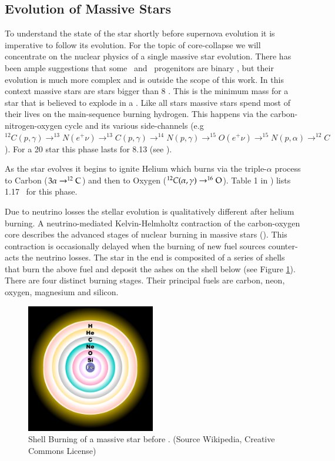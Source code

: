 \subsection{Evolution of Massive Stars}  To understand the state of the star shortly before supernova evolution it is imperative to follow its evolution. For the topic of core-collapse we will concentrate on the nuclear physics of a single massive star evolution. There has been ample suggestions that some \snii\ and \snibc\ progenitors are binary \citep{1992ApJ...391..246P}, but their evolution is much more complex and is outside the scope of this work.  In this context massive stars are stars bigger than 8 \msun. This is the minimum mass for a star that is believed to explode in a \snii. Like all stars massive stars spend most of their lives on the main-sequence burning hydrogen. This happens via the carbon-nitrogen-oxygen cycle and its various side-channels (e.g $^{12}C(p,\gamma)\rightarrow^{13}N(e^+\nu)\rightarrow^{13}C(p,\gamma)\rightarrow^{14}N(p,\gamma)\rightarrow^{15}O(e^+\nu)\rightarrow^{15}N(p,\alpha)\rightarrow^{12}C$). For a 20 \msun star this phase lasts for 8.13 \myr (see \citet{2002RvMP...74.1015W}).

As the star evolves it begins to ignite Helium which burns via the triple-$\alpha$ process to Carbon ($3\alpha\rightarrow^{12}\textrm{C}$) and then to Oxygen ($^{12}C(\alpha,\gamma)\rightarrow^{16}\textrm{O}$). Table 1 in \citet{2002RvMP...74.1015W}) lists 1.17 \myr\ for this phase. 

Due to neutrino losses the stellar evolution is qualitatively different after helium burning. A neutrino-mediated Kelvin-Helmholtz contraction of the carbon-oxygen core describes the advanced stages of nuclear burning in massive stars (\citet{2002RvMP...74.1015W}). This contraction is occasionally delayed when the burning of new fuel sources counter-acts the neutrino losses. The star in the end is composited of a series of shells that burn the above fuel and deposit the ashes on the shell below (see Figure \ref{fig:fusion_shells}). There are four distinct burning stages. Their principal fuels are carbon, neon, oxygen, magnesium and silicon.

\begin{figure}[htbp] %
   \centering
   \includegraphics[width=0.5\textwidth]{chapter_intro/plots/fusion_shells.pdf} 
   \caption{Shell Burning of a massive star before . (Source  Wikipedia, Creative Commons License)}
   \label{fig:fusion_shells}
\end{figure}


